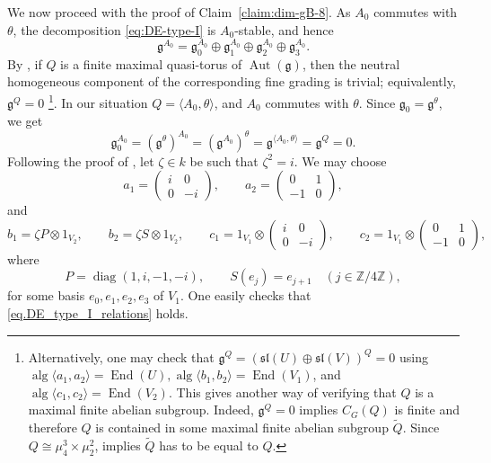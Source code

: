 \documentclass[12pt]{amsart}
\numberwithin{equation}{section}
\theoremstyle{remark}
\newcommand{\alg}{\operatorname{alg}}
\newcommand{\Aut}{\operatorname{Aut}}
\newcommand{\End}{\operatorname{End}}
\begin{document}
We now proceed with the proof of Claim~\ref{claim:dim-gB-8}.
As $A_0$ commutes with $\theta$, the decomposition \eqref{eq:DE-type-I} is $A_0$-stable,
and hence
\[
        \mathfrak g^{A_0}
        =
        \mathfrak g_{0}^{A_0}\oplus
        \mathfrak g_{1}^{A_0}\oplus
        \mathfrak g_{2}^{A_0}\oplus
        \mathfrak g_{3}^{A_0}.
\]
By \cite[Section 2, p.~3]{draper2017maximal}, if $Q$ is a finite
maximal quasi-torus of $\Aut(\mathfrak g)$, then the neutral homogeneous
component of the corresponding fine grading is trivial; equivalently, $\mathfrak g^Q=0$ \footnote{Alternatively, one may check that $\mathfrak g^Q= (\mathfrak{sl}(U)\oplus \mathfrak{sl}(V))^Q = 0$ using $\alg\langle a_1,a_2\rangle = \End(U), \alg\langle b_1,b_2\rangle = \End(V_1)$, and $ \alg\langle c_1,c_2\rangle = \End(V_2)$. This gives another way of verifying that $Q$ is a maximal finite abelian subgroup. Indeed, $\mathfrak g^Q =0$ implies $C_G(Q)$ is finite and therefore $Q$ is contained in some maximal finite abelian subgroup $\tilde{Q}$. Since $Q\cong \mu_4^3\times \mu_2^2$, \cite[Theorem 1.1]{draper2017maximal} implies $\tilde{Q}$ has to be equal to $Q$.}. 
In our situation $Q=\langle A_0,\theta\rangle$, and $A_0$ commutes with
$\theta$. Since $\mathfrak g_0=\mathfrak g^\theta$, we get
\begin{equation}\label{eq:g0-inv}
\mathfrak g_0^{A_0} = (\mathfrak g^\theta)^{A_0} = (\mathfrak g^{A_0})^\theta = \mathfrak g^{\langle {A_0},\theta\rangle} = \mathfrak g^Q = 0.
\end{equation}
Following the proof of
\cite[Theorem 5.2, p.~9]{draper2017maximal}, let $\zeta\in k$ be such that $\zeta^2=i$. We may choose
\[
        a_1=\begin{pmatrix}
        i&0\\
        0&-i
        \end{pmatrix},\qquad
        a_2=
        \begin{pmatrix}
        0&1\\
        -1&0
        \end{pmatrix},
\]
and
\[
        b_1=\zeta P\otimes 1_{V_2},
        \qquad
        b_2=\zeta S\otimes 1_{V_2},
        \qquad
        c_1=1_{V_1}\otimes
        \begin{pmatrix}
        i&0\\
        0&-i
        \end{pmatrix},
        \qquad
        c_2=1_{V_1}\otimes
        \begin{pmatrix}
        0&1\\
        -1&0
        \end{pmatrix},
\]
where
\[
        P=\operatorname{diag}(1,i,-1,-i),
        \qquad
        S(e_j)=e_{j+1}
        \quad (j\in \mathbb Z/4\mathbb Z),
\]
for some basis $e_0,e_1,e_2,e_3$ of $V_1$. One easily checks that \eqref{eq.DE_type_I_relations} holds. 
\end{document}
